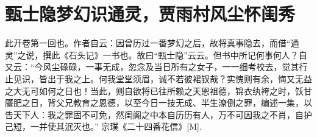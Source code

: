 \documentclass{dutrep}
\begin{document}
\chapter{甄士隐梦幻识通灵，贾雨村风尘怀闺秀}
此开卷第一回也。作者自云：因曾历过一番梦幻之后，故将真事隐去，而借“通灵”之说，撰此《石头记》一书也。故曰“甄士隐”云云。但书中所记何事何人？自又云：“今风尘碌碌，一事无成，忽念及当日所有之女子，一一细考校去，觉其行止见识，皆出于我之上。何我堂堂须眉，诚不若彼裙钗哉？实愧则有余，悔又无益之大无可如何之日也！当此，则自欲将已往所赖之天恩祖德，锦衣纨袴之时，饫甘餍肥之日，背父兄教育之恩德，以至今日一技无成、半生潦倒之罪，编述一集，以告天下人：我之罪固不可免，然闺阁之中本自历历有人，万不可因我之不肖，自护己短，一并使其泯灭也。”
宗璞《二十四番花信》[M].
\end{document}
